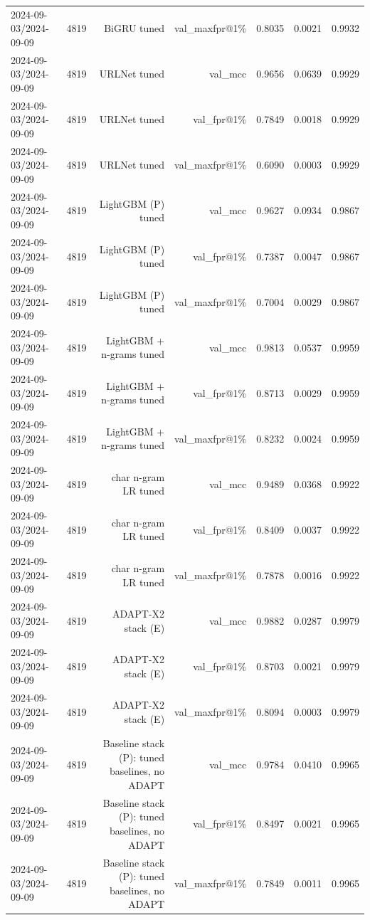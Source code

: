 \begin{table}[t]
\begin{tabular}{llrrrrr}
2024-09-03/2024-09-09 & 4819 & BiGRU tuned & val\_maxfpr@1\% & 0.8035 & 0.0021 & 0.9932 \\
2024-09-03/2024-09-09 & 4819 & URLNet tuned & val\_mcc & 0.9656 & 0.0639 & 0.9929 \\
2024-09-03/2024-09-09 & 4819 & URLNet tuned & val\_fpr@1\% & 0.7849 & 0.0018 & 0.9929 \\
2024-09-03/2024-09-09 & 4819 & URLNet tuned & val\_maxfpr@1\% & 0.6090 & 0.0003 & 0.9929 \\
2024-09-03/2024-09-09 & 4819 & LightGBM (P) tuned & val\_mcc & 0.9627 & 0.0934 & 0.9867 \\
2024-09-03/2024-09-09 & 4819 & LightGBM (P) tuned & val\_fpr@1\% & 0.7387 & 0.0047 & 0.9867 \\
2024-09-03/2024-09-09 & 4819 & LightGBM (P) tuned & val\_maxfpr@1\% & 0.7004 & 0.0029 & 0.9867 \\
2024-09-03/2024-09-09 & 4819 & LightGBM + n-grams tuned & val\_mcc & 0.9813 & 0.0537 & 0.9959 \\
2024-09-03/2024-09-09 & 4819 & LightGBM + n-grams tuned & val\_fpr@1\% & 0.8713 & 0.0029 & 0.9959 \\
2024-09-03/2024-09-09 & 4819 & LightGBM + n-grams tuned & val\_maxfpr@1\% & 0.8232 & 0.0024 & 0.9959 \\
2024-09-03/2024-09-09 & 4819 & char n-gram LR tuned & val\_mcc & 0.9489 & 0.0368 & 0.9922 \\
2024-09-03/2024-09-09 & 4819 & char n-gram LR tuned & val\_fpr@1\% & 0.8409 & 0.0037 & 0.9922 \\
2024-09-03/2024-09-09 & 4819 & char n-gram LR tuned & val\_maxfpr@1\% & 0.7878 & 0.0016 & 0.9922 \\
2024-09-03/2024-09-09 & 4819 & ADAPT-X2 stack (E) & val\_mcc & 0.9882 & 0.0287 & 0.9979 \\
2024-09-03/2024-09-09 & 4819 & ADAPT-X2 stack (E) & val\_fpr@1\% & 0.8703 & 0.0021 & 0.9979 \\
2024-09-03/2024-09-09 & 4819 & ADAPT-X2 stack (E) & val\_maxfpr@1\% & 0.8094 & 0.0003 & 0.9979 \\
2024-09-03/2024-09-09 & 4819 & Baseline stack (P): tuned baselines, no ADAPT & val\_mcc & 0.9784 & 0.0410 & 0.9965 \\
2024-09-03/2024-09-09 & 4819 & Baseline stack (P): tuned baselines, no ADAPT & val\_fpr@1\% & 0.8497 & 0.0021 & 0.9965 \\
2024-09-03/2024-09-09 & 4819 & Baseline stack (P): tuned baselines, no ADAPT & val\_maxfpr@1\% & 0.7849 & 0.0011 & 0.9965 \\

\end{tabular}
\end{table}
